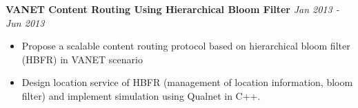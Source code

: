 \documentclass[9pt]{article}
\newenvironment{changemargin}[2]{%
  \begin{list}{}{%
    \setlength{\topsep}{0pt}%
    \setlength{\leftmargin}{#1}%
    \setlength{\rightmargin}{#2}%
    \setlength{\listparindent}{\parindent}%
    \setlength{\itemindent}{\parindent}%
    \setlength{\parsep}{\parskip}%
  }%
  \item[]}{\end{list}
}
\newenvironment{body} {
	\vspace*{-16pt}
	\begin{changemargin}{-0.25in}{-0.5in}
  }	
	{\end{changemargin}
}
\begin{document}
\begin{body}
	\textbf{VANET Content Routing Using Hierarchical Bloom Filter} \hfill \emph{Jan 2013 - Jun 2013}\\
	\vspace*{-4pt}
	\begin{itemize} \itemsep -0pt  %
		\item Propose a scalable content routing protocol based on hierarchical bloom filter (HBFR) in 
		VANET scenario
		\item Design location service of HBFR (management of location information, bloom 
		filter) and implement simulation using Qualnet in C++. 
	\end{itemize}

\end{body}

\smallskip

\end{document}
